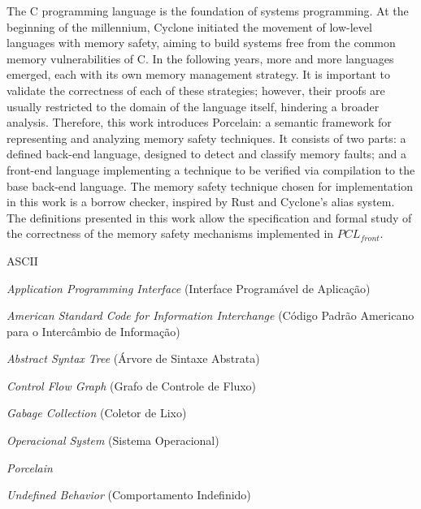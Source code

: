 \documentclass[cic,tc]{iiufrgs}
\begin{document}
\begin{translatedabstract}
The C programming language is the foundation of systems programming. At the beginning of the millennium, Cyclone initiated the movement of low-level languages with memory safety, aiming to build systems free from the common memory vulnerabilities of C. In the following years, more and more languages emerged, each with its own memory management strategy. It is important to validate the correctness of each of these strategies; however, their proofs are usually restricted to the domain of the language itself, hindering a broader analysis. Therefore, this work introduces Porcelain: a semantic framework for representing and analyzing memory safety techniques. It consists of two parts: a defined back-end language, designed to detect and classify memory faults; and a front-end language implementing a technique to be verified via compilation to the base back-end language. The memory safety technique chosen for implementation in this work is a borrow checker, inspired by Rust and Cyclone’s alias system. The definitions presented in this work allow the specification and formal study of the correctness of the memory safety mechanisms implemented in $PCL_{front}$.
\end{translatedabstract}

\listoffigures

\listoftables

\begin{listofabbrv}{ASCII}
    \item[API] \emph{Application Programming Interface} (Interface Programável de Aplicação)
	\item[ASCII] \emph{American Standard Code for Information Interchange} (Código Padrão Americano para o Intercâmbio de Informação)
    \item[AST] \emph{Abstract Syntax Tree} (Árvore de Sintaxe Abstrata)
    \item[CFG] \emph{Control Flow Graph} (Grafo de Controle de Fluxo)
    \item[GC] \emph{Gabage Collection} (Coletor de Lixo)
    \item[OS] \emph{Operacional System} (Sistema Operacional)
    \item[PCL] \emph{Porcelain}
    \item[UB] \emph{Undefined Behavior} (Comportamento Indefinido)
\end{listofabbrv}
\end{document}
